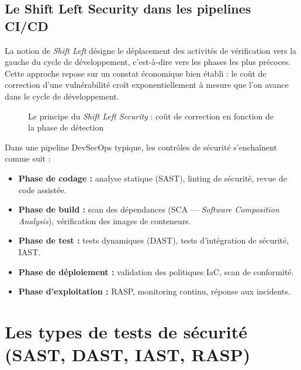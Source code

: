 \subsection{Le Shift Left Security dans les pipelines CI/CD}

La notion de \textit{Shift Left} désigne le déplacement des activités de
vérification vers la gauche du cycle de développement, c'est-à-dire vers les
phases les plus précoces. Cette approche repose sur un constat économique bien
établi : le coût de correction d'une vulnérabilité croît exponentiellement à
mesure que l'on avance dans le cycle de développement.

\begin{figure}[H]
  \centering
  \caption{Le principe du \textit{Shift Left Security} : coût de correction
    en fonction de la phase de détection}
  \label{fig:shift_left}
\end{figure}

Dans une pipeline DevSecOps typique, les contrôles de sécurité s'enchaînent
comme suit :

\begin{itemize}
  \item \textbf{Phase de codage :} analyse statique (SAST), linting de sécurité,
    revue de code assistée.
  \item \textbf{Phase de build :} scan des dépendances (SCA --- \textit{Software
    Composition Analysis}), vérification des images de conteneurs.
  \item \textbf{Phase de test :} tests dynamiques (DAST), tests d'intégration
    de sécurité, IAST.
  \item \textbf{Phase de déploiement :} validation des politiques IaC,
    scan de conformité.
  \item \textbf{Phase d'exploitation :} RASP, monitoring continu, réponse aux
    incidents.
\end{itemize}

\section{Les types de tests de sécurité (SAST, DAST, IAST, RASP)}

